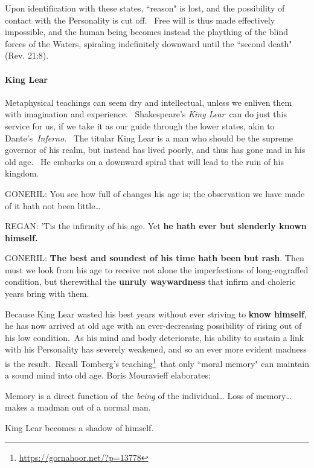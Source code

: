 Upon identification with these states, ``reason" is lost, and the possibility of contact with the Personality is cut off.  Free will is thus made effectively impossible, and the human being becomes instead the plaything of the blind forces of the Waters, spiraling indefinitely downward until the ``second death" (Rev. 21:8).

\paragraph{King Lear}
Metaphysical teachings can seem dry and intellectual, unless we enliven them with imagination and experience.  Shakespeare's \emph{King Lear} can do just this service for us, if we take it as our guide through the lower states, akin to Dante's \emph{Inferno}.  The titular King Lear is a man who should be the supreme governor of his realm, but instead has lived poorly, and thus has gone mad in his old age.  He embarks on a downward spiral that will lead to the ruin of his kingdom.

\begin{quotex}

GONERIL: You see how full of changes his age is; the observation we have made of it hath not been little…

REGAN: 'Tis the infirmity of his age. Yet \textbf{he hath ever but slenderly known himself.}

GONERIL: \textbf{The best and soundest of his time hath been but rash}. Then must we look from his age to receive not alone the imperfections of long-engraffed condition, but therewithal the \textbf{unruly waywardness} that infirm and choleric years bring with them.


\end{quotex}
Because King Lear wasted his best years without ever striving to \textbf{know himself}, he has now arrived at old age with an ever-decreasing possibility of rising out of his low condition. As his mind and body deteriorate, his ability to sustain a link with his Personality has severely weakened, and so an ever more evident madness is the result. Recall Tomberg's teaching\footnote{\url{https://gornahoor.net/?p=13778}} that only ``moral memory" can maintain a sound mind into old age. Boris Mouravieff elaborates:

\begin{quotex}
Memory is a direct function of the \emph{being} of the individual… Loss of memory… makes a madman out of a normal man. 

\end{quotex}
King Lear becomes a shadow of himself. 

